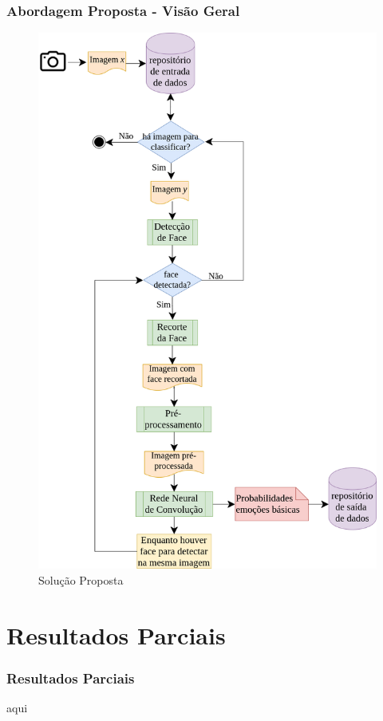 \documentclass{beamer}
\begin{document}
\begin{frame}
\frametitle{Abordagem Proposta - Visão Geral}
\begin{figure}
\centering
\includegraphics[scale=0.17]{figuras/arquitetura.png}
\caption{Solução Proposta}
\label{fig:arquitetura}
\end{figure}
\end{frame}


\section{Resultados Parciais}
\begin{frame}
\frametitle{Resultados Parciais}
aqui
\end{frame}
\end{document}
